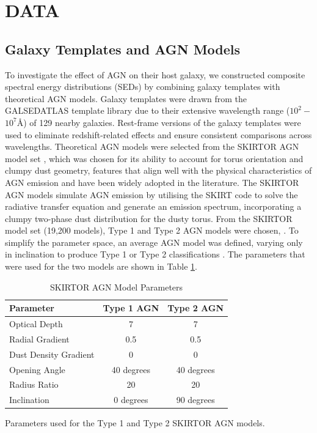 \documentclass[
  journal=pasa,
  manuscript=research-paper,
  year=202X,
  volume=YY,
]{cup-journal}
\begin{document}
\section{DATA}
\label{sec:Data}

\subsection{Galaxy Templates and AGN Models}
To investigate the effect of AGN on their host galaxy, we constructed composite spectral energy distributions (SEDs) by combining galaxy templates with theoretical AGN models. Galaxy templates were drawn from the GALSEDATLAS template library \citep{brown_atlas_2014} due to their extensive wavelength range ($10^2 -$$10^7${\AA}) of 129 nearby galaxies. Rest-frame versions of the galaxy templates were used to eliminate redshift-related effects and ensure consistent comparisons across wavelengths. Theoretical AGN models were selected from the SKIRTOR AGN model set \citep{stalevski_3d_2012, stalevski_dust_2016}, which was chosen for its ability to account for torus orientation and clumpy dust geometry, features that align well with the physical characteristics of AGN emission and have been widely adopted in the literature. The SKIRTOR AGN models simulate AGN emission by utilising the SKIRT code \citep{camps_skirt_2015} to solve the radiative transfer equation and generate an emission spectrum, incorporating a clumpy two-phase dust distribution for the dusty torus. From the SKIRTOR model set (19,200 models), Type 1 and Type 2 AGN models were chosen, . To simplify the parameter space, an average AGN model was defined, varying only in inclination to produce Type 1 or Type 2 classifications \citep{ciesla_constraining_2015}. The parameters that were used for the two models are shown in Table \ref{tab:agn_parameters}.
\begin{table}[hbt!]
\begin{threeparttable}
\caption{SKIRTOR AGN Model Parameters}
\label{tab:agn_parameters}
\begin{tabular}{lcc}
\toprule
\headrow Parameter & Type 1 AGN & Type 2 AGN \\
\midrule
Optical Depth & 7 & 7 \\
Radial Gradient & 0.5 & 0.5 \\
Dust Density Gradient & 0 & 0 \\
Opening Angle & 40 degrees & 40 degrees \\
Radius Ratio & 20 & 20 \\
Inclination & 0 degrees & 90 degrees \\
\bottomrule
\end{tabular}
\begin{tablenotes}[hang]
\item[] Parameters used for the Type 1 and Type 2 SKIRTOR AGN models.
\end{tablenotes}
\end{threeparttable}
\end{table}
\end{document}

